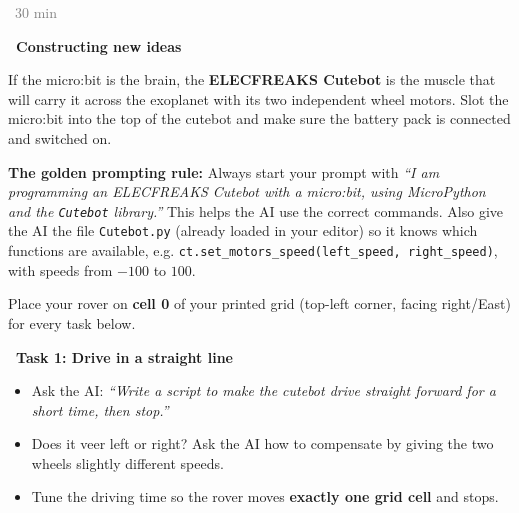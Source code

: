 \documentclass[12pt]{article}
\newcounter{exercise}
\newcommand{\exercisetitle}[2][]{%
  \refstepcounter{exercise}%
  \vspace{0.5cm}%
  \colorbox{maincolor}{%
    \makebox[\dimexpr\linewidth-2\fboxsep][l]{%
      \textcolor{white}{\faPen\ Assignment \theexercise:~ #2}%
    }%
  }%
  \if\relax\detokenize{#1}\relax\else\label{#1}\fi
  \vspace{0.3cm}%
}
\newenvironment{solution}{%
  \begin{solutionbox}\textbf{\faChalkboardTeacher\ Solution / notes for the teacher:}
}{%
  \end{solutionbox}
}
\begin{document}

\exercisetitle{Calibrate your rover}\label{ass:calibrate}
\textcolor{gray}{\faClock\ 30 min}

\textcolor{accentcolor}{\textbf{\faLightbulb\ Constructing new ideas}}

\vspace{0.2cm}
If the micro:bit is the brain, the \textbf{ELECFREAKS Cutebot} is the muscle that will carry it across the exoplanet with its two independent wheel motors. Slot the micro:bit into the top of the cutebot and make sure the battery pack is connected and switched on.


\begin{importantbox}
\textbf{The golden prompting rule:} Always start your prompt with \textit{``I am programming an ELECFREAKS Cutebot with a micro:bit, using MicroPython and the \texttt{Cutebot} library.''} This helps the AI use the correct commands. Also give the AI the file \texttt{Cutebot.py} (already loaded in your editor) so it knows which functions are available, e.g. \texttt{ct.set\_motors\_speed(left\_speed, right\_speed)}, with speeds from $-100$ to $100$.
\end{importantbox}

Place your rover on \textbf{cell 0} of your printed grid (top-left corner, facing right/East) for every task below.

\vspace{0.3cm}
\textbf{\faArrowRight\ Task 1: Drive in a straight line}

\begin{itemize}
  \item[$\square$] Ask the AI: \textit{``Write a script to make the cutebot drive straight forward for a short time, then stop.''}
  \item[$\square$] Does it veer left or right? Ask the AI how to compensate by giving the two wheels slightly different speeds.
  \item[$\square$] Tune the driving time so the rover moves \textbf{exactly one grid cell} and stops.
\end{itemize}
\end{document}
